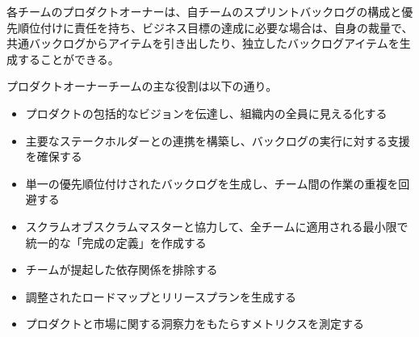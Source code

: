 \documentclass[12pt,a4paper,parskip=full]{scrartcl}
\begin{document}

各チームのプロダクトオーナーは、自チームのスプリントバックログの構成と優先順位付けに責任を持ち、ビジネス目標の達成に必要な場合は、自身の裁量で、共通バックログからアイテムを引き出したり、独立したバックログアイテムを生成することができる。

プロダクトオーナーチームの主な役割は以下の通り。

\begin{itemize}
\itemsep1pt\parskip0pt

\item
プロダクトの包括的なビジョンを伝達し、組織内の全員に見える化する
\item
主要なステークホルダーとの連携を構築し、バックログの実行に対する支援を確保する
\item
単一の優先順位付けされたバックログを生成し、チーム間の作業の重複を回避する
\item
スクラムオブスクラムマスターと協力して、全チームに適用される最小限で統一的な「完成の定義」を作成する
\item
チームが提起した依存関係を排除する
\item
調整されたロードマップとリリースプランを生成する
\item
プロダクトと市場に関する洞察力をもたらすメトリクスを測定する
\end{itemize}

\end{document}
